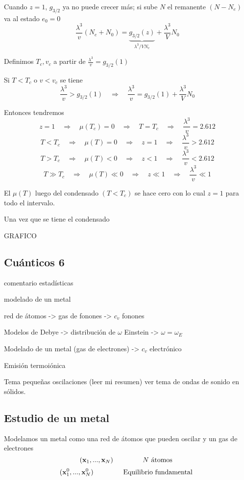 \documentclass[10pt,oneside]{CBFT_book}
\begin{document}
Cuando $z=1$, $g_{3/2}$  ya no puede crecer más; si sube $N$ el remanente $(N-N_e)$ va al estado 
$e_0=0$
\[
	\frac{\lambda^3}{v}(N_e+N_0) = \underbrace{g_{3/2}(z)}_{\lambda^3/V N_e} + \frac{\lambda^3}{V} N_0
\]

Definimos $T_c, v_c$ a partir de $\frac{\lambda^3}{v} = g_{3/2}(1)$ 

Si $ T<T_c$ o $v<v_c$ se tiene 
\[
	\frac{\lambda^3}{v} > g_{3/2}(1) \quad \Rightarrow \quad \frac{\lambda^3}{v} =
	g_{3/2}(1) + \frac{\lambda^3}{V} N_0
\]

Entonces tendremos 
\[
	z = 1 \quad \Rightarrow \quad \mu(T_c) = 0 \quad \Rightarrow \quad T=T_c \quad \Rightarrow \quad  
	\frac{\lambda^3}{v} = 2.612
\]
\[
	T < T_c \quad \Rightarrow \quad \mu(T) = 0 \quad \Rightarrow \quad z = 1 \quad \Rightarrow \quad  
	\frac{\lambda^3}{v} > 2.612
\]
\[
	T > T_c \quad \Rightarrow \quad \mu(T) < 0 \quad \Rightarrow \quad z < 1 \quad \Rightarrow \quad  
	\frac{\lambda^3}{v} < 2.612
\]
\[
	T \gg T_c \quad \Rightarrow \quad \mu(T) \ll 0 \quad \Rightarrow \quad z \ll 1 \quad \Rightarrow \quad  
	\frac{\lambda^3}{v} \ll 1
\]

El $\mu(T)$ luego del condensado $(T<T_c)$ se hace cero con lo cual $z=1$ para todo el intervalo.

Una vez que se tiene el condensado

GRAFICO

\subsection{Cuánticos 6}

comentario estadísticas

modelado de un metal

red de átomos -> gas de fonones -> $c_v$ fonones

Modelos de Debye -> distribución de $\omega$
Einstein -> $\omega = \omega_E$

Modelado de un metal (gas de electrones) -> $c_v$ electrónico

Emisión termoiónica

Tema pequeñas oscilaciones (leer mi resumen)
ver tema de ondas de sonido en sólidos.

\subsection{Estudio de un metal}

Modelamos un metal como una red de átomos que pueden oscilar y un gas de electrones
\[
	(\vb{x}_1, ...,\vb{x}_N ) \qquad \qquad \text{ $N$ átomos }
\]
\[
	(\vb{x}_1^0, ...,\vb{x}_N^0 ) \qquad \qquad \text{ Equilibrio fundamental }
\]
\end{document}
